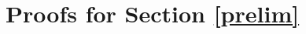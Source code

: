 \documentclass[11pt,a4paper]{article}
\theoremstyle{definition}
\theoremstyle{remark}
\newenvironment{proofof}[1][]{\begin{trivlist}
\item[\hskip \labelsep {\textit{Proof of #1.}}]}{\hfill{}$\square$\end{trivlist}}
\newcommand\ci{\protect\mathpalette{\protect\independenT}{\perp}}
\def\independenT#1#2{\mathrel{\rlap{$#1#2$}\mkern2mu{#1#2}}}
\newcommand{\g}[1][G]{\mathcal{#1}}
\begin{document}
%






\section{Proofs for Section \ref{prelim}}



	
	
	
	
	
\end{document}
